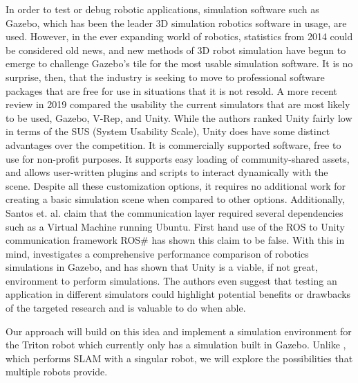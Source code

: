 \documentclass[11pt, conference]{IEEEtran}
\begin{document}
In order to test or debug robotic applications, simulation software such as Gazebo, which has been the leader 3D simulation robotics software \cite{Tools} in usage, are used. However, in the ever expanding world of robotics, statistics from 2014 could be considered old news, and new methods of 3D robot simulation have begun to emerge to challenge Gazebo's tile for the most usable simulation software. It is no surprise, then, that the industry is seeking to move to professional software packages that are free for use in situations that it is not resold. A more recent review in 2019 \cite{CompareSim} compared the usability the current simulators that are most likely to be used, Gazebo, V-Rep, and Unity. 
While the authors ranked Unity fairly low in terms of the SUS (System Usability Scale), Unity does have some distinct advantages over the competition. It is commercially supported software, free to use for non-profit purposes. It supports easy loading of community-shared assets, and allows user-written plugins and scripts to interact dynamically with the scene. Despite all these customization options, it requires no additional work for creating a basic simulation scene when compared to other options. %
Additionally, Santos et. al. claim that the communication layer required several dependencies such as a Virtual Machine running Ubuntu. First hand use of the ROS to Unity communication framework ROS\# has shown this claim to be false. With this in mind, \cite{Konrad2019SimulationOM} investigates a comprehensive performance comparison of robotics simulations in Gazebo, and has shown that Unity is a viable, if not great, environment to perform simulations. The authors even suggest that testing an application in different simulators could highlight potential benefits or drawbacks of the targeted research and is valuable to do when able.

Our approach will build on this idea and implement a simulation environment for the Triton robot which currently only has a simulation built in Gazebo. Unlike \cite{Konrad2019SimulationOM}, which performs SLAM with a singular robot, we will explore the possibilities that multiple robots provide.



\end{document}
